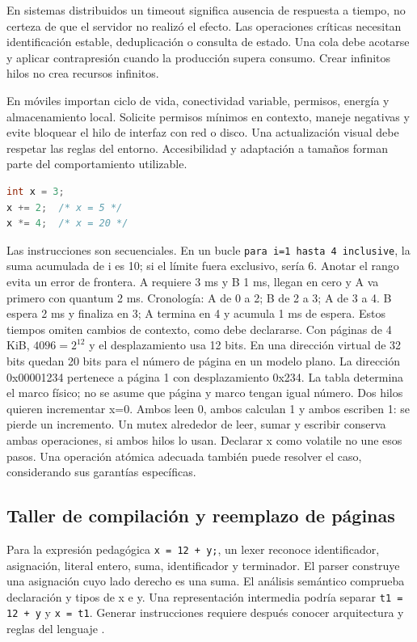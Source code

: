 En sistemas distribuidos un timeout significa ausencia de respuesta a tiempo, no certeza de que el servidor no realizó el efecto. Las operaciones críticas necesitan identificación estable, deduplicación o consulta de estado. Una cola debe acotarse y aplicar contrapresión cuando la producción supera consumo. Crear infinitos hilos no crea recursos infinitos.

En móviles importan ciclo de vida, conectividad variable, permisos, energía y almacenamiento local. Solicite permisos mínimos en contexto, maneje negativas y evite bloquear el hilo de interfaz con red o disco. Una actualización visual debe respetar las reglas del entorno. Accesibilidad y adaptación a tamaños forman parte del comportamiento utilizable.
\begin{lstlisting}[language=C]
int x = 3;
x += 2;  /* x = 5 */
x *= 4;  /* x = 20 */
\end{lstlisting}
Las instrucciones son secuenciales. En un bucle \texttt{para i=1 hasta 4 inclusive}, la suma acumulada de i es 10; si el límite fuera exclusivo, sería 6. Anotar el rango evita un error de frontera.
A requiere 3 ms y B 1 ms, llegan en cero y A va primero con quantum 2 ms. Cronología: A de 0 a 2; B de 2 a 3; A de 3 a 4. B espera 2 ms y finaliza en 3; A termina en 4 y acumula 1 ms de espera. Estos tiempos omiten cambios de contexto, como debe declararse.
Con páginas de 4 KiB, $4096=2^{12}$ y el desplazamiento usa 12 bits. En una dirección virtual de 32 bits quedan 20 bits para el número de página en un modelo plano. La dirección 0x00001234 pertenece a página 1 con desplazamiento 0x234. La tabla determina el marco físico; no se asume que página y marco tengan igual número.
Dos hilos quieren incrementar x=0. Ambos leen 0, ambos calculan 1 y ambos escriben 1: se pierde un incremento. Un mutex alrededor de leer, sumar y escribir conserva ambas operaciones, si ambos hilos lo usan. Declarar x como volatile no une esos pasos. Una operación atómica adecuada también puede resolver el caso, considerando sus garantías específicas.

\subsection{Taller de compilación y reemplazo de páginas}
Para la expresión pedagógica \texttt{x = 12 + y;}, un lexer reconoce identificador, asignación, literal entero, suma, identificador y terminador. El parser construye una asignación cuyo lado derecho es una suma. El análisis semántico comprueba declaración y tipos de x e y. Una representación intermedia podría separar \texttt{t1 = 12 + y} y \texttt{x = t1}. Generar instrucciones requiere después conocer arquitectura y reglas del lenguaje \cite{compiler}.

